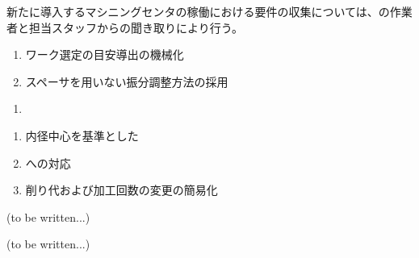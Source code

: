 

新たに導入するマシニングセンタの稼働における要件の収集については、\MMC の作業者と担当スタッフからの聞き取りにより行う。


\begin{enumerate}[label=\sarrow]
\item ワーク\FixtureBolt 選定の目安導出の機械化
\item スペーサを用いない振分調整方法の採用
\end{enumerate}



\begin{enumerate}[label=\sarrow]
\item
\end{enumerate}



\begin{enumerate}[label=\sarrow]
\item 内径中心を基準とした\EndFacecutMilling
\item \ODCornerR への対応
\item {}削り代および加工回数の変更の簡易化
\end{enumerate}



(to be written...)



(to be written...)



